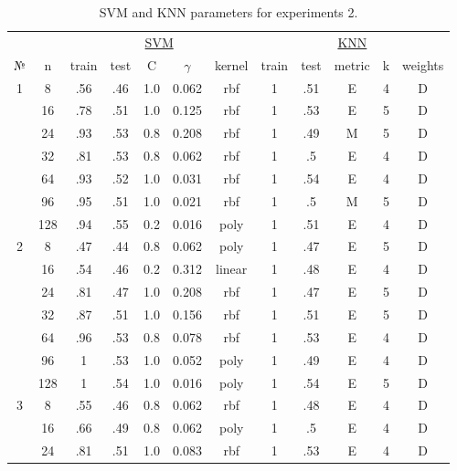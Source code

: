 \begin{table}
\centering
\caption{SVM and KNN parameters for experiments 2.}
\label{tab:params_2_svm_knn}
\begin{tabular}{|c|c|ccccc||ccccc|}\hline
& & \multicolumn{5}{c||}{\underline{SVM}} & \multicolumn{5}{c|}{\underline{KNN}}\\
№ &   n & train & test &   C & $\gamma$ & kernel & train & test & metric & k & weights \\\hline
1 &   8 &   .56 &  .46 & 1.0 &    0.062 &    rbf &     1 &  .51 &      E & 4 &       D \\
  &  16 &   .78 &  .51 & 1.0 &    0.125 &    rbf &     1 &  .53 &      E & 5 &       D \\
  &  24 &   .93 &  .53 & 0.8 &    0.208 &    rbf &     1 &  .49 &      M & 5 &       D \\
  &  32 &   .81 &  .53 & 0.8 &    0.062 &    rbf &     1 &   .5 &      E & 4 &       D \\
  &  64 &   .93 &  .52 & 1.0 &    0.031 &    rbf &     1 &  .54 &      E & 4 &       D \\
  &  96 &   .95 &  .51 & 1.0 &    0.021 &    rbf &     1 &   .5 &      M & 5 &       D \\
  & 128 &   .94 &  .55 & 0.2 &    0.016 &   poly &     1 &  .51 &      E & 4 &       D \\\hline
2 &   8 &   .47 &  .44 & 0.8 &    0.062 &   poly &     1 &  .47 &      E & 5 &       D \\
  &  16 &   .54 &  .46 & 0.2 &    0.312 & linear &     1 &  .48 &      E & 4 &       D \\
  &  24 &   .81 &  .47 & 1.0 &    0.208 &    rbf &     1 &  .47 &      E & 5 &       D \\
  &  32 &   .87 &  .51 & 1.0 &    0.156 &    rbf &     1 &  .51 &      E & 5 &       D \\
  &  64 &   .96 &  .53 & 0.8 &    0.078 &    rbf &     1 &  .53 &      E & 4 &       D \\
  &  96 &     1 &  .53 & 1.0 &    0.052 &   poly &     1 &  .49 &      E & 4 &       D \\
  & 128 &     1 &  .54 & 1.0 &    0.016 &   poly &     1 &  .54 &      E & 5 &       D \\\hline
3 &   8 &   .55 &  .46 & 0.8 &    0.062 &    rbf &     1 &  .48 &      E & 4 &       D \\
  &  16 &   .66 &  .49 & 0.8 &    0.062 &   poly &     1 &   .5 &      E & 4 &       D \\
  &  24 &   .81 &  .51 & 1.0 &    0.083 &    rbf &     1 &  .53 &      E & 4 &       D \\

\end{tabular}
\end{table}
